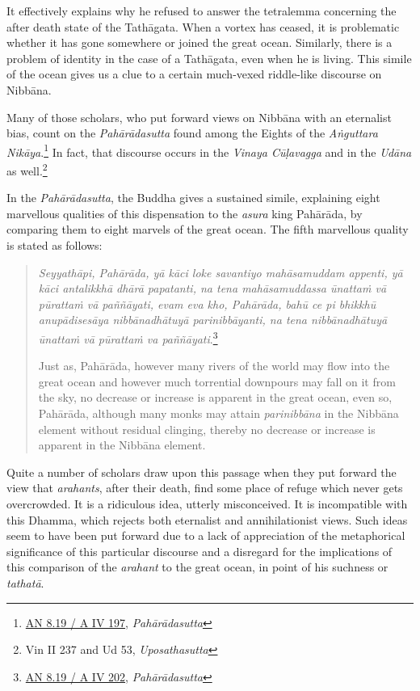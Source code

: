 It effectively explains why he refused to answer the tetralemma concerning the after death state of the Tathāgata. When a vortex has ceased, it is problematic whether it has gone somewhere or joined the great ocean. Similarly, there is a problem of identity in the case of a Tathāgata, even when he is living. This simile of the ocean gives us a clue to a certain much-vexed riddle-like discourse on Nibbāna.

Many of those scholars, who put forward views on Nibbāna with an eternalist bias, count on the \emph{Pahārādasutta} found among the Eights of the \emph{Aṅguttara Nikāya}.\footnote{\href{https://suttacentral.net/an8.19/pli/ms}{AN 8.19 / A IV 197}, \emph{Pahārādasutta}} In fact, that discourse occurs in the \emph{Vinaya Cūḷavagga} and in the \emph{Udāna} as well.\footnote{Vin II 237 and Ud 53, \emph{Uposathasutta}}

In the \emph{Pahārādasutta}, the Buddha gives a sustained simile, explaining eight marvellous qualities of this dispensation to the \emph{asura} king Pahārāda, by comparing them to eight marvels of the great ocean. The fifth marvellous quality is stated as follows:

\begin{quote}
\emph{Seyyathāpi, Pahārāda, yā kāci loke savantiyo mahāsamuddam appenti, yā kāci antalikkhā dhārā papatanti, na tena mahāsamuddassa ūnattaṁ vā pūrattaṁ vā paññāyati, evam eva kho, Pahārāda, bahū ce pi bhikkhū anupādisesāya nibbānadhātuyā parinibbāyanti, na tena nibbānadhātuyā ūnattaṁ vā pūrattaṁ va paññāyati}.\footnote{\href{https://suttacentral.net/an8.19/pli/ms}{AN 8.19 / A IV 202}, \emph{Pahārādasutta}}

Just as, Pahārāda, however many rivers of the world may flow into the great ocean and however much torrential downpours may fall on it from the sky, no decrease or increase is apparent in the great ocean, even so, Pahārāda, although many monks may attain \emph{parinibbāna} in the Nibbāna element without residual clinging, thereby no decrease or increase is apparent in the Nibbāna element.
\end{quote}

Quite a number of scholars draw upon this passage when they put forward the view that \emph{arahants}, after their death, find some place of refuge which never gets overcrowded. It is a ridiculous idea, utterly misconceived. It is incompatible with this Dhamma, which rejects both eternalist and annihilationist views. Such ideas seem to have been put forward due to a lack of appreciation of the metaphorical significance of this particular discourse and a disregard for the implications of this comparison of the \emph{arahant} to the great ocean, in point of his suchness or \emph{tathatā}.

